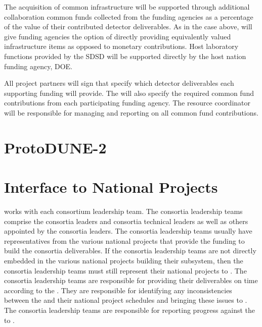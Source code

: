 The acquisition of common infrastructure will be supported through
additional collaboration common funds collected from the funding
agencies as a percentage of the value of their contributed detector
deliverables.  As in the case above,  will give funding
agencies the option of directly providing equivalently valued
infrastructure items as opposed to monetary contributions.  Host
laboratory functions provided by the SDSD will be supported directly
by the host nation funding agency, DOE.

All project partners will sign  that specify which
detector deliverables each supporting funding will provide. The
 will also specify the required common fund contributions
from each participating funding agency.  The  resource
coordinator will be responsible for managing and reporting on all
common fund contributions.

\section{ProtoDUNE-2}
\label{sec:fdsp-coord-protodune2}

\section{Interface to National Projects}
\label{sec:fdsp-coord-national}

  works with each consortium leadership
team. The consortia leadership teams comprise the consortia leaders
and consortia technical leaders as well as others appointed by the
consortia leaders. The consortia leadership teams usually have
representatives from the various national projects that provide the
funding to build the consortia deliverables. If the consortia
leadership teams are not directly embedded in the various national
projects building their subsystem, then the consortia leadership teams
must still represent their national projects to . The
consortia leadership teams are responsible for providing their
deliverables on time according to the . They are
responsible for identifying any inconsistencies between the
 and their national project schedules and bringing these
issues to . The consortia leadership teams are responsible
for reporting progress against the  to .
